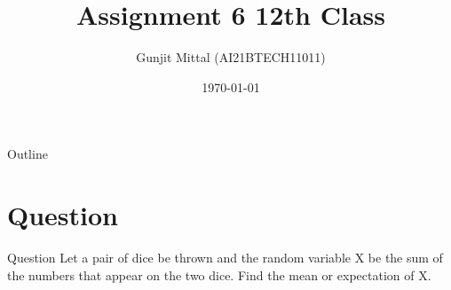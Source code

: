 \documentclass{beamer}
\title{Assignment 6 12th Class}
\author{Gunjit Mittal (AI21BTECH11011)}
\date{\today}
\theoremstyle{remark}
\numberwithin{equation}{section}
\numberwithin{figure}{section}
\numberwithin{table}{section}
\begin{document}
 
\begin{frame}
  \titlepage 
\end{frame}
\logo{}
\begin{frame}{Outline}
  \tableofcontents
\end{frame}
\section{Question}
\begin{frame}{Question}
Let a pair of dice be thrown and the random variable X be the sum of the
numbers that appear on the two dice. Find the mean or expectation of X.
\end{frame}
\end{document}
